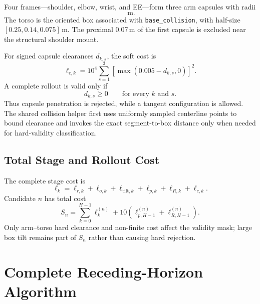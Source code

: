 \documentclass[11pt,a4paper]{article}
\newcommand{\code}[1]{\texttt{#1}}
\begin{document}
Four frames---shoulder, elbow, wrist, and EE---form three arm capsules with
radii
\begin{equation}
  [0.030,0.030,0.0375]\;\mathrm{m}.
\end{equation}
The torso is the oriented box associated with \code{base\_collision}, with
half-size $[0.25,0.14,0.075]\,\mathrm{m}$. The proximal $0.07\,\mathrm{m}$ of
the first capsule is excluded near the structural shoulder mount.

For signed capsule clearances $d_{k,s}$, the soft cost is
\begin{equation}
  \boxed{
  \ell_{c,k}
  =10^4\sum_{s=1}^{3}
  [\max(0.005-d_{k,s},0)]^2.
  }
\end{equation}
A complete rollout is valid only if
\begin{equation}
  d_{k,s}\geq0
  \qquad\text{for every }k\text{ and }s.
\end{equation}
Thus capsule penetration is rejected, while a tangent configuration is
allowed. The shared collision helper first uses uniformly sampled centerline
points to bound clearance and invokes the exact segment-to-box distance only
when needed for hard-validity classification.

\subsection{Total Stage and Rollout Cost}

The complete stage cost is
\begin{equation}
  \ell_k
  =\ell_{r,k}+\ell_{o,k}+\ell_{\mathrm{tilt},k}
   +\ell_{p,k}+\ell_{R,k}+\ell_{c,k}.
\end{equation}
Candidate $n$ has total cost
\begin{equation}
  \boxed{
  S_n
  =\sum_{k=0}^{H-1}\ell_k^{(n)}
   +10\left(
     \ell_{p,H-1}^{(n)}+\ell_{R,H-1}^{(n)}
   \right).
  }
\end{equation}
Only arm--torso hard clearance and non-finite cost affect the validity mask;
large box tilt remains part of $S_n$ rather than causing hard rejection.

\section{Complete Receding-Horizon Algorithm}
\end{document}

